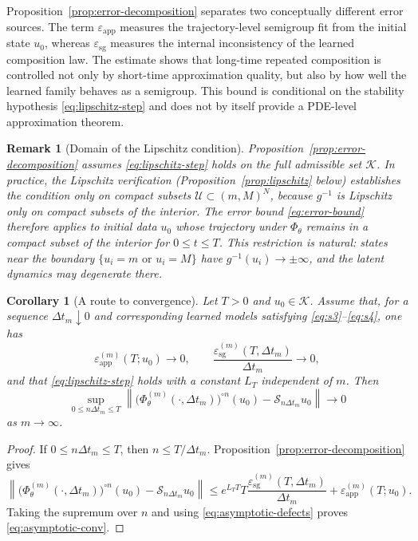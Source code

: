 \documentclass[11pt]{article}
\newtheorem{remark}{Remark}
\newtheorem{corollary}{Corollary}
\newcommand{\cS}{\mathcal{S}}
\newcommand{\cU}{\mathcal{U}}
\newcommand{\cK}{\mathcal{K}}
\newcommand{\PhiT}{\Phi_{\theta}}
\newcommand{\norm}[1]{\left\lVert #1 \right\rVert}
\begin{document}
Proposition~\ref{prop:error-decomposition} separates two conceptually different error sources. The term \(\varepsilon_{\mathrm{app}}\) measures the trajectory-level semigroup fit from the initial state \(u_0\), whereas \(\varepsilon_{\mathrm{sg}}\) measures the internal inconsistency of the learned composition law. The estimate shows that long-time repeated composition is controlled not only by short-time approximation quality, but also by how well the learned family behaves as a semigroup. This bound is conditional on the stability hypothesis \eqref{eq:lipschitz-step} and does not by itself provide a PDE-level approximation theorem.

\begin{remark}[Domain of the Lipschitz condition]\label{rem:lipschitz-domain}
Proposition~\ref{prop:error-decomposition} assumes \eqref{eq:lipschitz-step} holds on the full admissible set $\cK$. In practice, the Lipschitz verification (Proposition~\ref{prop:lipschitz} below) establishes the condition only on compact subsets $\cU\subset(m,M)^N$, because $g^{-1}$ is Lipschitz only on compact subsets of the interior. The error bound \eqref{eq:error-bound} therefore applies to initial data $u_0$ whose trajectory under $\PhiT$ remains in a compact subset of the interior for $0\le t\le T$. This restriction is natural: states near the boundary $\{u_i=m\text{ or }u_i=M\}$ have $g^{-1}(u_i)\to\pm\infty$, and the latent dynamics may degenerate there.
\end{remark}

\begin{corollary}[A route to convergence]\label{cor:global-convergence}
Let \(T>0\) and \(u_0\in \cK\). Assume that, for a sequence \(\Delta t_m\downarrow 0\) and corresponding learned models satisfying \eqref{eq:s3}--\eqref{eq:s4}, one has
\begin{equation}\label{eq:asymptotic-defects}
\varepsilon_{\mathrm{app}}^{(m)}(T;u_0)\to 0, \qquad \frac{\varepsilon_{\mathrm{sg}}^{(m)}(T,\Delta t_m)}{\Delta t_m}\to 0,
\end{equation}
and that \eqref{eq:lipschitz-step} holds with a constant \(L_T\) independent of \(m\). Then
\begin{equation}\label{eq:asymptotic-conv}
\sup_{0\le n\Delta t_m\le T}\norm{\bigl(\PhiT^{(m)}(\cdot,\Delta t_m)\bigr)^{\circ n}(u_0)-\cS_{n\Delta t_m}u_0}\to 0
\end{equation}
as \(m\to \infty\).
\end{corollary}

\begin{proof}
If \(0\le n\Delta t_m\le T\), then \(n\le T/\Delta t_m\). Proposition~\ref{prop:error-decomposition} gives
\begin{equation*}
\norm{\bigl(\PhiT^{(m)}(\cdot,\Delta t_m)\bigr)^{\circ n}(u_0)-\cS_{n\Delta t_m}u_0}
\le e^{L_TT}T\frac{\varepsilon_{\mathrm{sg}}^{(m)}(T,\Delta t_m)}{\Delta t_m}+\varepsilon_{\mathrm{app}}^{(m)}(T;u_0).
\end{equation*}
Taking the supremum over \(n\) and using \eqref{eq:asymptotic-defects} proves \eqref{eq:asymptotic-conv}.
\end{proof}
\end{document}
